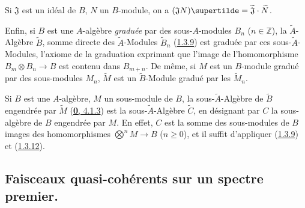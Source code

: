 \begin{env}[1.3.13]
Si $\mathfrak{J}$ est un idéal de $B$, $N$ un $B$-module, on a
$(\mathfrak{J}N)\supertilde=\widetilde{\mathfrak{J}}\cdot\widetilde{N}$.

Enfin, si $B$ est une $A$-algèbre \emph{graduée} par des sous-$A$-modules $B_n$
($n\in\mathbb{Z}$), la $\widetilde{A}$-Algèbre $\widetilde{B}$, somme directe
des $\widetilde{A}$-Modules $\widetilde{B}_n$
(\hyperref[I.1.3.9-fr]{1.3.9}) est graduée par ces sous-$\widetilde{A}$-Modules,
l'axiome de la graduation exprimant que l'image de l'homomorphisme
$B_m\otimes B_n\to B$ est contenu dans $B_{m+n}$. De même, si $M$ est un
$B$-module gradué par des sous-modules $M_n$, $\widetilde{M}$ est un
$\widetilde{B}$-Module gradué par les $\widetilde{M}_n$.
\end{env}

\begin{env}[1.3.14]
\label{I.1.3.14-fr}
Si $B$ est une $A$-algèbre, $M$ un sous-module de $B$, la
sous-$\widetilde{A}$-Algèbre de $\widetilde{B}$ engendrée par $\widetilde{M}$
(\hyperref[0.4.1.3-fr]{\textbf{0}, 4.1.3}) est la sous-$\widetilde{A}$-Algèbre
$\widetilde{C}$, en désignant par $C$ la sous-algèbre de $B$ engendrée par
$M$. En effet, $C$ est la somme des sous-modules de $B$ images des
homomorphismes $\bigotimes^n M\to B$ ($n\geq0$), et il suffit d'appliquer
(\hyperref[I.1.3.9-fr]{1.3.9}) et (\hyperref[I.1.3.12-fr]{1.3.12}).
\end{env}

\subsection{Faisceaux quasi-cohérents sur un spectre premier.}
\label{subsection:I.1.4-fr}

